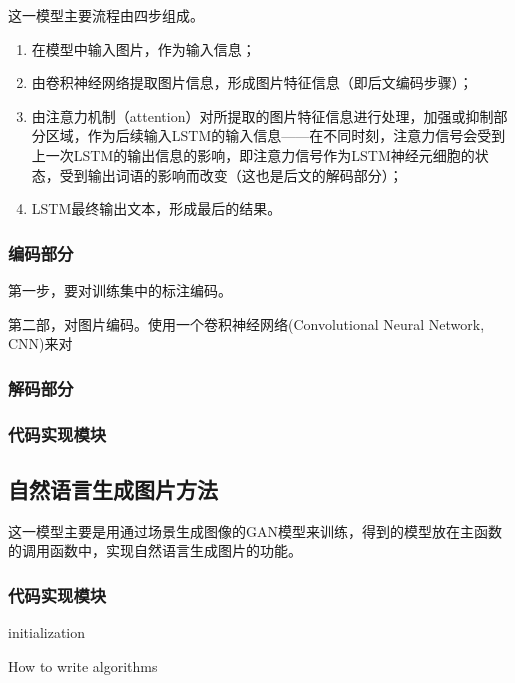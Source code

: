 这一模型主要流程由四步组成。

\begin{enumerate}[fullwidth,itemindent=2em,label=\arabic*.]
    \item 在模型中输入图片，作为输入信息；
    \item 由卷积神经网络提取图片信息，形成图片特征信息（即后文编码步骤）；
    \item 由注意力机制（attention）对所提取的图片特征信息进行处理，加强或抑制部分区域，作为后续输入LSTM的输入信息——在不同时刻，注意力信号会受到上一次LSTM的输出信息的影响，即注意力信号作为LSTM神经元细胞的状态，受到输出词语的影响而改变（这也是后文的解码部分）；
    \item LSTM最终输出文本，形成最后的结果。
\end{enumerate}

\subsubsection{编码部分}
第一步，要对训练集中的标注编码。

第二部，对图片编码。使用一个卷积神经网络(Convolutional Neural Network, CNN)来对

\subsubsection{解码部分}


\subsubsection{代码实现模块}


\subsection{自然语言生成图片方法}
这一模型主要是用通过场景生成图像的GAN模型来训练，得到的模型放在主函数的调用函数中，实现自然语言生成图片的功能。


\subsubsection{代码实现模块}

\begin{algorithm}[H]
    \SetAlgoLined
     initialization\;
    \caption{How to write algorithms}
  \end{algorithm}
